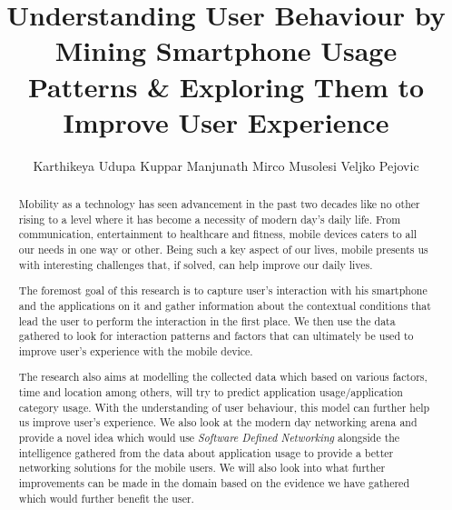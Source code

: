 \documentclass[prodmode,acmtecs]{acmsmall}
\begin{document}

\title{Understanding User Behaviour by Mining Smartphone Usage Patterns \& Exploring Them to Improve User Experience}
\author{Karthikeya Udupa Kuppar Manjunath
Mirco Musolesi
Veljko Pejovic
}

\begin{abstract}

\noindent
Mobility as a technology has seen advancement in the past two decades like no other rising to a level where it has become a necessity of modern day's daily life. From communication, entertainment to healthcare and fitness, mobile devices caters to all our needs in one way or other. Being such a key aspect of our lives, mobile presents us with interesting challenges that, if solved, can help improve our daily lives. 

The foremost goal of this research is to capture user's interaction with his smartphone and the applications on it and gather information about the contextual conditions that lead the user to perform the interaction in the first place. We then use the data gathered to look for interaction patterns and factors that can ultimately be used to improve user's experience with the mobile device. 

The research also aims at modelling the collected data which based on various factors, time and location among others, will try to predict application usage/application category usage. With the understanding of user behaviour, this model can further help us improve user’s experience. We also look at the modern day networking arena and provide a novel idea which would use \textit{Software Defined Networking} alongside the intelligence gathered from the data about application usage to provide a better networking solutions for the mobile users. We will also look into what further improvements can be made in the domain based on the evidence we have gathered which would further benefit the user.


\end{abstract}



\end{document}
